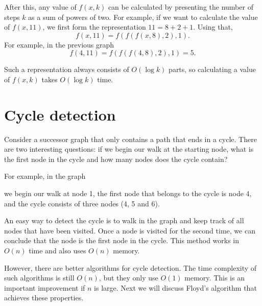 After this, any value of $f(x,k)$ can be calculated
by presenting the number of steps $k$ as a sum of powers of two.
For example, if we want to calculate the value of $f(x,11)$,
we first form the representation $11=8+2+1$.
Using that,
\[f(x,11)=f(f(f(x,8),2),1).\]
For example, in the previous graph
\[f(4,11)=f(f(f(4,8),2),1)=5.\]

Such a representation always consists of
$O(\log k)$ parts, so calculating a value of $f(x,k)$
takes $O(\log k)$ time.

\section{Cycle detection}


Consider a successor graph that only contains
a path that ends in a cycle.
There are two interesting questions:
if we begin our walk at the starting node,
what is the first node in the cycle
and how many nodes does the cycle contain?

For example, in the graph

\begin{center}
\end{center}
we begin our walk at node 1,
the first node that belongs to the cycle is node 4, and the cycle consists
of three nodes (4, 5 and 6).

An easy way to detect the cycle is to walk in the
graph and keep track of
all nodes that have been visited. Once a node is visited
for the second time, we can conclude
that the node is the first node in the cycle.
This method works in $O(n)$ time and also uses
$O(n)$ memory.

However, there are better algorithms for cycle detection.
The time complexity of such algorithms is still $O(n)$,
but they only use $O(1)$ memory.
This is an important improvement if $n$ is large.
Next we will discuss Floyd's algorithm that
achieves these properties.


